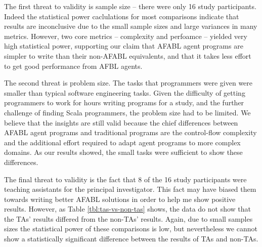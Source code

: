 The first threat to validity is sample size -- there were only 16 study participants. Indeed the statistical power caclulations for most comparisons indicate that results are inconclusive due to the small sample sizes and large variances in many metrics. However, two core metrics -- complexity and perfoamce -- yielded very high statistical power, supporting our claim that AFABL agent programs are simpler to write than their non-AFABL equivalents, and that it takes less effort to get good performance from AFBL agents.

The second threat is problem size. The tasks that programmers were given were smaller than typical software engineering tasks. Given the difficulty of getting programmers to work for hours writing programs for a study, and the further challenge of finding Scala programmers, the problem size had to be limited. We believe that the insights are still valid because the chief differences between AFABL agent programs and traditional programs are the control-flow complexity and the additional effort required to adapt agent programs to more complex domains. As our results showed, the small tasks were sufficient to show these differences.

The final threat to validity is the fact that 8 of the 16 study participants were teaching assistants for the principal investigator. This fact may have biased them towards writing better AFABL solutions in order to help me show positive results. However, as Table \ref{tbl:tas-vs-non-tas} shows, the data do not show that the TAs' results differed from the non-TAs' results. Again, due to small samples sizes the statistical power of these comparisons is low, but nevertheless we cannot show a statistically significant difference between the results of TAs and non-TAs.

